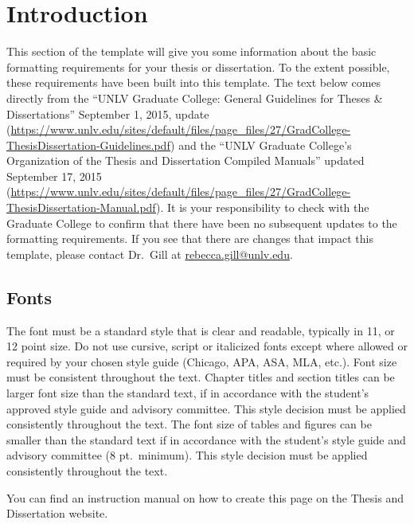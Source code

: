 \chapter[: Introduction]{Introduction} 

This section of the template will give you some information about the basic formatting requirements for your thesis or dissertation. To the extent possible, these requirements have been built into this template. The text below comes directly from the ``UNLV Graduate College: General Guidelines for Theses \& Dissertations'' September 1, 2015, update (\url{https://www.unlv.edu/sites/default/files/page_files/27/GradCollege-ThesisDissertation-Guidelines.pdf}) and the ``UNLV Graduate College's Organization of the Thesis and Dissertation Compiled Manuals'' updated September 17, 2015 (\url{https://www.unlv.edu/sites/default/files/page_files/27/GradCollege-ThesisDissertation-Manual.pdf}). It is your responsibility to check with the Graduate College to confirm that there have been no subsequent updates to the formatting requirements. If you see that there are changes that impact this template, please contact Dr.\ Gill at \url{rebecca.gill@unlv.edu}. 

\section{Fonts}

The font must be a standard style that is clear and readable, typically in 11, or 12 point size. Do not use cursive, script or italicized fonts except where allowed or required by your chosen style guide (Chicago, APA, ASA, MLA, etc.). Font size must be consistent throughout the text. Chapter titles and section titles can be larger font size than the standard text, if in accordance with the student's approved style guide and advisory committee. This style decision must be applied consistently throughout the text. The font size of tables and figures can be smaller than the standard text if in accordance with the student's style guide and advisory committee (8 pt.\ minimum). This style decision must be applied consistently throughout the text.

You can find an instruction manual on how to create this page on the Thesis and Dissertation
website. 

